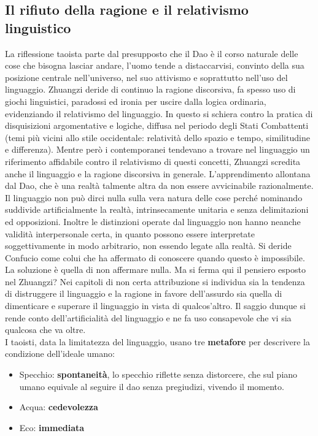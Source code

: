 \documentclass[10pt,a4paper]{report}
\begin{document}
\subsection{Il rifiuto della ragione e il relativismo linguistico} 
La riflessione taoista parte dal presupposto che il Dao è il corso naturale delle cose che bisogna lasciar andare, l'uomo tende a distaccarvisi, convinto della sua posizione centrale nell'universo, nel suo attivismo e soprattutto nell'uso del linguaggio. Zhuangzi deride di continuo la ragione discorsiva, fa spesso uso di giochi linguistici, paradossi ed ironia per uscire dalla logica ordinaria, evidenziando il relativismo del linguaggio. In questo si schiera contro la pratica di disquisizioni argomentative e logiche, diffusa nel periodo degli Stati Combattenti (temi più vicini allo stile occidentale: relatività dello spazio e tempo, similitudine e differenza). Mentre però i contemporanei tendevano a trovare nel linguaggio un riferimento affidabile contro il relativismo di questi concetti, Zhuangzi scredita anche il linguaggio e la ragione discorsiva in generale. L'apprendimento allontana dal Dao, che è una realtà talmente altra da non essere avvicinabile razionalmente. Il linguaggio non può dirci nulla sulla vera natura delle cose perché nominando suddivide artificialmente la realtà, intrinsecamente unitaria e senza delimitazioni ed opposizioni. Inoltre le distinzioni operate dal linguaggio non hanno neanche validità interpersonale certa, in quanto possono essere interpretate soggettivamente in modo arbitrario, non essendo legate alla realtà. Si deride Confucio come colui che ha affermato di conoscere quando questo è impossibile. La soluzione è quella di non affermare nulla. Ma si ferma qui il pensiero esposto nel Zhuangzi? Nei capitoli di non certa attribuzione si individua sia la tendenza di distruggere il linguaggio e la ragione in favore dell'assurdo sia quella di dimenticare e superare il linguaggio in vista di qualcos'altro. Il saggio dunque si rende conto dell'artificialità del linguaggio e ne fa uso consapevole che vi sia qualcosa che va oltre.\\
I taoisti, data la limitatezza del linguaggio, usano tre \textbf{metafore} per descrivere la condizione dell'ideale umano:
\begin{itemize}
	\item Specchio: \textbf{spontaneità}, lo specchio riflette senza distorcere, che sul piano umano equivale al seguire il dao senza pregiudizi, vivendo il momento. 
	\item Acqua: \textbf{cedevolezza}
	\item Eco: \textbf{immediata}
\end{itemize}
\end{document}
